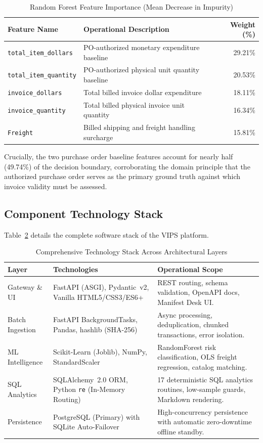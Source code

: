 \documentclass[conference]{IEEEtran}
\begin{document}
\begin{table}[t]
\centering
\caption{Random Forest Feature Importance (Mean Decrease in Impurity)}
\label{tab:feature_importance}
\begin{tabular}{llr}
\toprule
\textbf{Feature Name} & \textbf{Operational Description} & \textbf{Weight (\%)} \\
\midrule
\texttt{total\_item\_dollars} & PO-authorized monetary expenditure baseline & 29.21\% \\
\texttt{total\_item\_quantity} & PO-authorized physical unit quantity baseline & 20.53\% \\
\texttt{invoice\_dollars} & Total billed invoice dollar expenditure & 18.11\% \\
\texttt{invoice\_quantity} & Total billed physical invoice unit quantity & 16.34\% \\
\texttt{Freight} & Billed shipping and freight handling surcharge & 15.81\% \\
\bottomrule
\end{tabular}
\end{table}

Crucially, the two purchase order baseline features account for nearly half (49.74\%) of the decision boundary, corroborating the domain principle that the authorized purchase order serves as the primary ground truth against which invoice validity must be assessed.

\subsection{Component Technology Stack}
Table~\ref{tab:tech_stack} details the complete software stack of the VIPS platform.

\begin{table}[t]
\centering
\caption{Comprehensive Technology Stack Across Architectural Layers}
\label{tab:tech_stack}
\begin{tabular}{p{}p{}p{}}
\toprule
\textbf{Layer} & \textbf{Technologies} & \textbf{Operational Scope} \\
\midrule
Gateway \& UI & FastAPI (ASGI), Pydantic~v2, Vanilla HTML5/CSS3/ES6+ & REST routing, schema validation, OpenAPI docs, Manifest Desk UI. \\
Batch Ingestion & FastAPI BackgroundTasks, Pandas, hashlib (SHA-256) & Async processing, deduplication, chunked transactions, error isolation. \\
ML Intelligence & Scikit-Learn (Joblib), NumPy, StandardScaler & RandomForest risk classification, OLS freight regression, catalog matching. \\
SQL Analytics & SQLAlchemy~2.0 ORM, Python \texttt{re} (In-Memory Routing) & 17 deterministic SQL analytics routines, low-sample guards, Markdown rendering. \\
Persistence & PostgreSQL (Primary) with SQLite Auto-Failover & High-concurrency persistence with automatic zero-downtime offline standby. \\
\bottomrule
\end{tabular}
\end{table}
\end{document}
